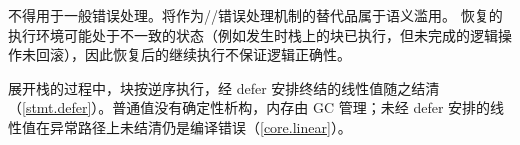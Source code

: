 \pnum
{}不得用于一般错误处理。将作为//\tcode{!!}错误处理机制的替代品属于语义滥用。
恢复的执行环境可能处于不一致的状态（例如发生时栈上的块已执行，但未完成的逻辑操作未回滚），因此恢复后的继续执行不保证逻辑正确性。

\pnum
{}展开栈的过程中，块按逆序执行，经 defer 安排终结的线性值随之结清（\ref{stmt.defer}）。普通值没有确定性析构，内存由 GC 管理；未经 defer 安排的线性值在异常路径上未结清仍是编译错误（\ref{core.linear}）。